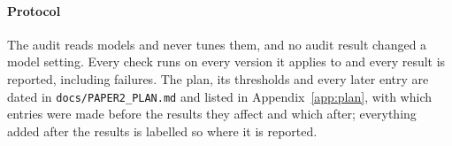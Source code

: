 \paragraph{Protocol}
The audit reads models and never tunes them, and no audit result changed a
model setting. Every check runs on every version it applies to and every result
is reported, including failures. The plan, its thresholds and every later
entry are dated in \texttt{docs/PAPER2\_PLAN.md} and listed in
Appendix~\ref{app:plan}, with which entries were made before the results they
affect and which after; everything added after the results is labelled so
where it is reported.
